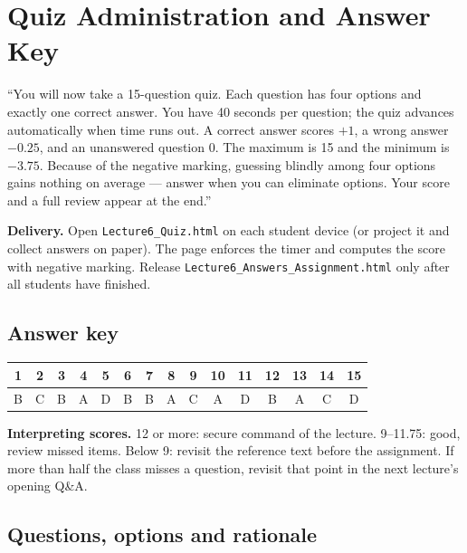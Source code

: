\documentclass[11pt]{article}
\begin{document}
\section{Quiz Administration and Answer Key}

\begin{sayit}``You will now take a 15-question quiz. Each question has four options and exactly one correct answer. You have 40 seconds per question; the quiz advances automatically when time runs out. A correct answer scores $+1$, a wrong answer $-0.25$, and an unanswered question 0. The maximum is 15 and the minimum is $-3.75$. Because of the negative marking, guessing blindly among four options gains nothing on average --- answer when you can eliminate options. Your score and a full review appear at the end.''\end{sayit}

\textbf{Delivery.} Open \texttt{Lecture6\_Quiz.html} on each student device (or project it and collect answers on paper). The page enforces the timer and computes the score with negative marking. Release \texttt{Lecture6\_Answers\_Assignment.html} only after all students have finished.

\subsection*{Answer key}\begin{center}\small\renewcommand{\arraystretch}{1.3}\begin{tabular}{|c|c|c|c|c|c|c|c|c|c|c|c|c|c|c|}\hline \textbf{1} & \textbf{2} & \textbf{3} & \textbf{4} & \textbf{5} & \textbf{6} & \textbf{7} & \textbf{8} & \textbf{9} & \textbf{10} & \textbf{11} & \textbf{12} & \textbf{13} & \textbf{14} & \textbf{15}\\\hline B & C & B & A & D & B & B & A & C & A & D & B & A & C & D\\\hline\end{tabular}\end{center}

\textbf{Interpreting scores.} 12 or more: secure command of the lecture. 9--11.75: good, review missed items. Below 9: revisit the reference text before the assignment. If more than half the class misses a question, revisit that point in the next lecture's opening Q\&A.

\subsection*{Questions, options and rationale}
\end{document}
